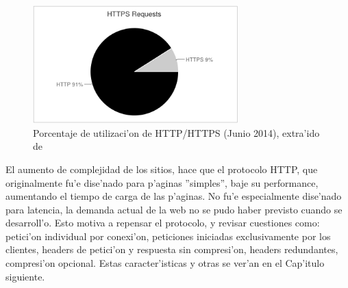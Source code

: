 \begin{figure}[h]
  	\centering
	\includegraphics[width=300px]{img/httphttps2014}
	\caption{\small Porcentaje de utilizaci'on de HTTP/HTTPS (Junio 2014), extra'ido de \cite{httparchive}}
	\label{httphttps2014}
\end{figure}

El aumento de complejidad de los sitios, hace que el protocolo HTTP, que originalmente fu'e dise'nado para p'aginas ''simples'', baje su performance, aumentando el tiempo de carga de las p'aginas. No fu'e especialmente dise'nado para latencia, la demanda actual de la web no se pudo haber previsto cuando se desarroll'o. Esto motiva a repensar el protocolo, y revisar cuestiones como: petici'on individual por conexi'on, peticiones iniciadas exclusivamente por los clientes, headers de petici'on y respuesta sin compresi'on, headers redundantes, compresi'on opcional. Estas caracter'isticas y otras se ver'an en el Cap'itulo siguiente.